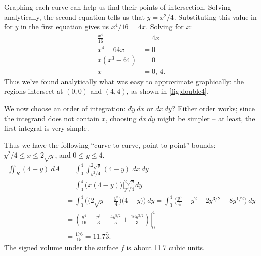 {Graphing each curve can help us find their points of intersection. Solving analytically, the second equation tells us that $y=x^2/4$. Substituting this value in for $y$ in the first equation gives us $x^4/16 = 4x$. Solving for $x$:
\begin{align*}
\frac{x^4}{16} &= 4x\\
x^4-64x &=0\\
x(x^3-64) &=0\\
x&= 0,\ 4.
\end{align*}
Thus we've found analytically what was easy to approximate graphically: the regions intersect at $(0,0)$ and $(4,4)$, as shown in \autoref{fig:double4}. 

We now choose an order of integration: $dy\ dx$ or $dx\ dy$? Either order works; since the integrand does not contain $x$, choosing $dx\ dy$ might be simpler -- at least, the first integral is very simple.

Thus we have the following ``curve to curve, point to point'' bounds: $y^2/4\leq x\leq 2\sqrt y$, and $0\leq y\leq 4$. 
\begin{align*}
\iint_R (4-y)\ dA &= \int_0^4\int_{y^2/4}^{2\sqrt{y}}(4-y)\ dx\ dy\\
				&= \int_0^4 \big(x(4-y)\big)\Big|_{y^2/4}^{2\sqrt{y}} dy\\
				&= \int_0^4 \Big(\big(2\sqrt{y}-\frac{y^2}{4}\big)\big(4-y)\Big)\ dy = \int_0^4 \Big( \frac{y^3}{4}-y^2-2y^{3/2}+8y^{1/2}\Big)\ dy\\
				&= \left.\left(\frac{y^4}{16}-\frac{y^3}{3}-\frac{4y^{5/2}}5+\frac{16y^{3/2}}3\right)\right|_0^4\\
				&= \frac{176}{15} = 11.7\overline{3}.
\end{align*}
The signed volume under the surface $f$ is about 11.7 cubic units.}


